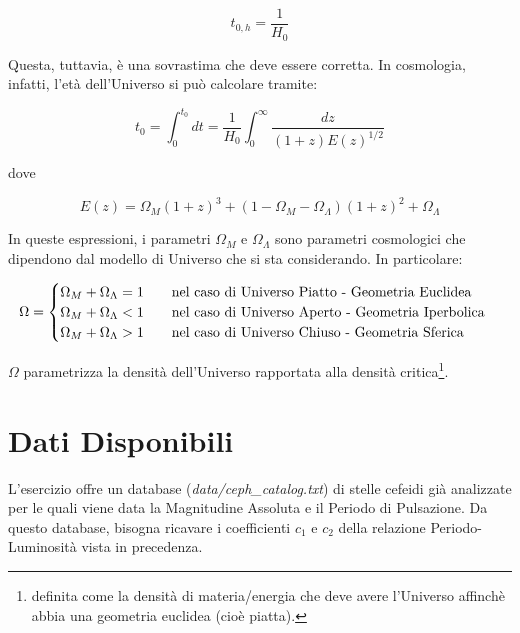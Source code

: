 \documentclass{article}
\begin{document}
\begin{equation}
  t_{0,h} = \frac{1}{H_0}
\end{equation}


Questa, tuttavia, è una sovrastima che deve essere corretta. In
cosmologia, infatti, l'età dell'Universo si può calcolare tramite:

\begin{equation}
  t_0 = \int_0^{t_0} dt = \frac{1}{H_0} \int_0^\infty \frac{dz}{\left
      ( 1+z \right ) E\left ( z \right ) ^{1/2}}
\end{equation}

dove

\begin{equation}\label{eqn:time}
  E\left ( z \right ) = \Omega_M \left ( 1+z \right ) ^3 + \left ( 1
    - \Omega_M - \Omega_\Lambda \right ) \left ( 1+z \right ) ^2
  +\Omega_\Lambda
\end{equation}

In queste espressioni, i parametri $\Omega_M$ e $\Omega_\Lambda$ sono
parametri cosmologici che dipendono dal modello di Universo che si sta
considerando. In particolare:

\begin{equation*}
  \Omega = 
  \begin{cases}
    \Omega_M + \Omega_\Lambda = 1 \qquad \hbox{nel caso di
      Universo Piatto - Geometria Euclidea} \\
    \Omega_M + \Omega_\Lambda < 1 \qquad \hbox{nel caso di
      Universo Aperto - Geometria Iperbolica} \\
    \Omega_M + \Omega_\Lambda > 1 \qquad \hbox{nel caso di
      Universo Chiuso - Geometria Sferica}
  \end{cases}
\end{equation*}

$\Omega$ parametrizza la densità dell'Universo rapportata alla densità
critica\footnote{definita come la densità di materia/energia che deve
  avere l'Universo affinchè abbia una geometria euclidea (cioè
  piatta).}.

\clearpage
\section{Dati Disponibili}



L'esercizio offre un database (\emph{data/ceph\_catalog.txt}) di stelle cefeidi già analizzate per le quali viene data la
Magnitudine Assoluta e il Periodo di Pulsazione. Da questo database,
bisogna ricavare i coefficienti $c_1$ e $c_2$ della relazione
Periodo-Luminosità vista in precedenza.
\end{document}
